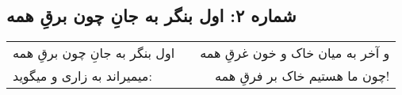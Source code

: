 \begin{center}
\section*{شماره ۲: اول بنگر به جانِ چون برقِ همه}
\label{sec:002}
\begin{longtable}{l p{0.5cm} r}
اول بنگر به جانِ چون برقِ همه
&&
و آخر به میان خاک و خون غرقِ همه
\\
میمیراند به زاری و میگوید:
&&
چون ما هستیم خاک بر فرقِ همه!
\\
\end{longtable}
\end{center}

